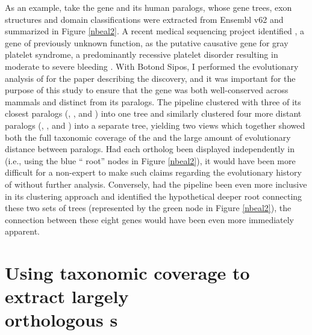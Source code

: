 As an example, take the gene  and its human paralogs,
whose gene trees, exon structures and domain classifications were
extracted from Ensembl v62 and summarized in Figure \ref{nbeal2}. A
recent medical sequencing project identified , a gene of
previously unknown function, as the putative causative gene for gray
platelet syndrome, a predominantly recessive platelet disorder
resulting in moderate to severe bleeding \citep{Albers2011}. With
Botond Sipos, I performed the evolutionary analysis of 
for the paper describing the discovery, and it was important for the
purpose of this study to ensure that the  gene was both
well-conserved across mammals and distinct from its paralogs. The \cmp
pipeline clustered  with three of its closest paralogs
(, , and ) into one tree and
similarly clustered four more distant  paralogs
(, ,  and ) into a
separate tree, yielding two views which together showed both the full
taxonomic coverage of the  \subtr{} and the large amount
of evolutionary distance between paralogs. Had each \mammln ortholog
been displayed independently in \ens (i.e., using the blue ``\euth
root'' nodes in Figure \ref{nbeal2}), it would have been more
difficult for a non-expert to make such claims regarding the
evolutionary history of  without further
analysis. Conversely, had the \cmp pipeline been even more inclusive
in its clustering approach and identified the hypothetical deeper root
connecting these two sets of trees (represented by the green node in
Figure \ref{nbeal2}), the connection between these eight genes would
have been even more immediately apparent.


\section[Using taxonomic coverage to extract largely orthologous \mammln \subtr{}s]{Using taxonomic coverage to extract largely \\ \mbox{orthologous} \mammln \subtr{}s}

